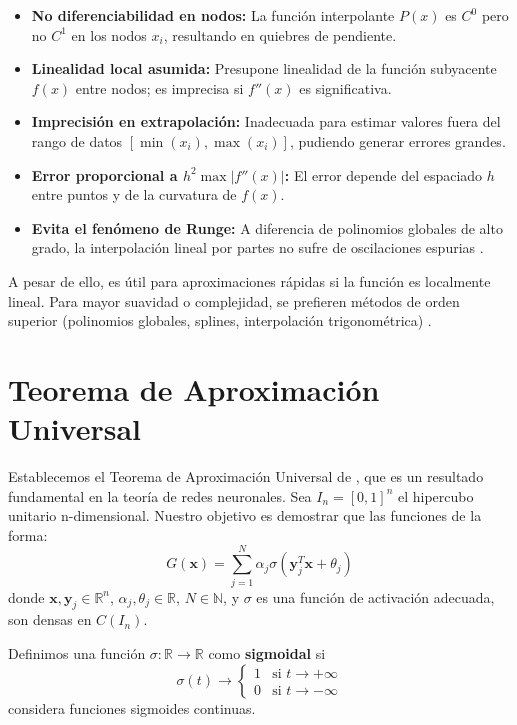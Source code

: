 \begin{itemize}
    \item \textbf{No diferenciabilidad en nodos:} La función interpolante $P(x)$ es $C^0$ pero no $C^1$ en los nodos $x_i$, resultando en quiebres de pendiente.

    \item \textbf{Linealidad local asumida:} Presupone linealidad de la función subyacente $f(x)$ entre nodos; es imprecisa si $f''(x)$ es significativa.

    \item \textbf{Imprecisión en extrapolación:} Inadecuada para estimar valores fuera del rango de datos $[\min(x_i), \max(x_i)]$, pudiendo generar errores grandes.

    \item \textbf{Error proporcional a $h^2 \max|f''(x)|$:} El error depende del espaciado $h$ entre puntos y de la curvatura de $f(x)$.

    \item \textbf{Evita el fenómeno de Runge:} A diferencia de polinomios globales de alto grado, la interpolación lineal por partes no sufre de oscilaciones espurias \citep{BurdenFaires2011}.
\end{itemize}
A pesar de ello, es útil para aproximaciones rápidas si la función es localmente lineal. Para mayor suavidad o complejidad, se prefieren métodos de orden superior (polinomios globales, splines, interpolación trigonométrica) \citep{KincaidCheney2002}.

\section{Teorema de Aproximación Universal}

Establecemos el Teorema de Aproximación Universal de \citet{Cybenko1989}, que es un resultado fundamental en la teoría de redes neuronales.
Sea $I_n = [0,1]^n$ el hipercubo unitario n-dimensional.
Nuestro objetivo es demostrar que las funciones de la forma:
\[ G(\mathbf{x}) = \sum_{j=1}^{N} \alpha_j \sigma(\mathbf{y}_j^T \mathbf{x} + \theta_j) \]
donde $\mathbf{x}, \mathbf{y}_j \in \mathbb{R}^n$, $\alpha_j, \theta_j \in \mathbb{R}$, $N \in \mathbb{N}$, y $\sigma$ es una función de activación adecuada, son densas en $C(I_n)$.

\begin{definition}
\label{def:sigmoidal_cybenko}
Definimos una función $\sigma: \mathbb{R} \to \mathbb{R}$ como \textbf{sigmoidal} \citep{Cybenko1989} si
\[ \sigma(t) \to \begin{cases} 1 & \text{si } t \to +\infty \\ 0 & \text{si } t \to -\infty \end{cases} \]
\citet{Cybenko1989} considera funciones sigmoides continuas.
\end{definition}

